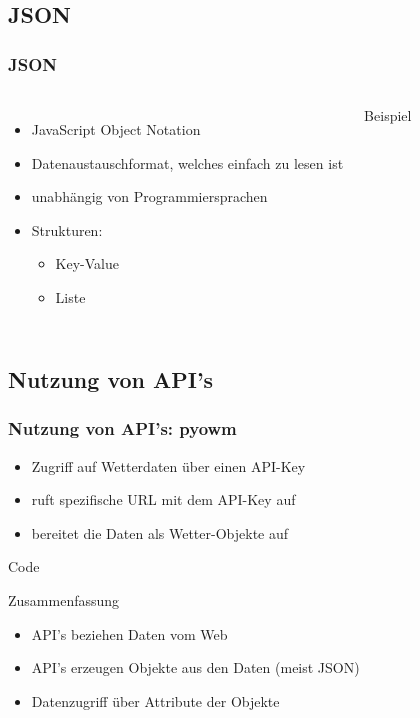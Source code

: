 \documentclass[11pt]{beamer}
\begin{document}
	\subsection{JSON}
\begin{frame}[fragile]
		\frametitle{JSON}
		\begin{columns}
			\column{.45\paperwidth}
				\begin{itemize}
					\item JavaScript Object Notation
					\item Datenaustauschformat, welches einfach zu lesen ist
					\item unabh\"angig von Programmiersprachen
					\item Strukturen:
					\begin{itemize}
						\item Key-Value
						\item Liste
					\end{itemize}
				\end{itemize}
			\column{.45\paperwidth}
			\begin{block}{Beispiel}
				
			\end{block}
		\end{columns}
\end{frame}

\subsection{Nutzung von API's}
\begin{frame}[fragile]
		\frametitle{Nutzung von API's: pyowm}
		\begin{itemize}
			\item Zugriff auf Wetterdaten \"uber einen API-Key
			\item ruft spezifische URL mit dem API-Key auf
			\item bereitet die Daten als Wetter-Objekte auf
		\end{itemize}
\begin{block}{Code}

\end{block}
		\pause
		\begin{block}{Zusammenfassung}
			\begin{itemize}
				\item API's beziehen Daten vom Web
				\item API's erzeugen Objekte aus den Daten (meist JSON)
				\item Datenzugriff \"uber Attribute der Objekte
			\end{itemize}
		\end{block}
\end{frame}
\end{document}

